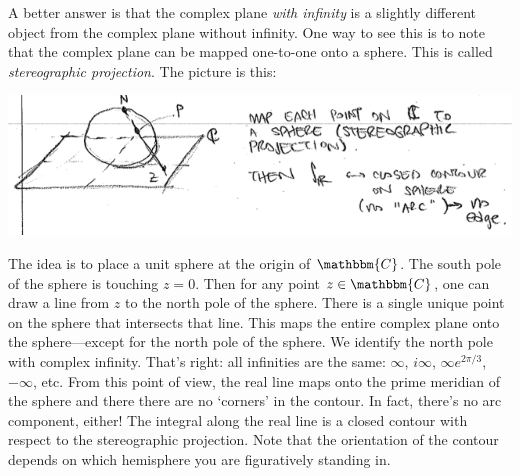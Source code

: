 A better answer is that the complex plane \emph{with infinity} is a slightly different object from the complex plane without infinity. One way to see this is to note that the complex plane can be mapped one-to-one onto a sphere. This is called \emph{stereographic projection}. The picture is this:
\begin{center}
\includegraphics[width=.9\textwidth]{figures/Lec_2017_stereographic.png}
\end{center}
The idea is to place a unit sphere at the origin of $\mathbbm{C}$. The south pole of the sphere is touching $z=0$. Then for any point $z\in\mathbbm{C}$, one can draw a line from $z$ to the north pole of the sphere. There is a single unique point on the sphere that intersects that line. This maps the entire complex plane onto the sphere---except for the north pole of the sphere. We identify the north pole with complex infinity. That's right: all infinities are the same: $\infty$, $i\infty$, $\infty e^{2\pi/3}$, $-\infty$, etc. From this point of view, the real line maps onto the prime meridian of the sphere and there there are no `corners' in the contour. In fact, there's no arc component, either! The integral along the real line is a closed contour with respect to the stereographic projection. Note that the orientation of the contour depends on which hemisphere you are figuratively standing in.

